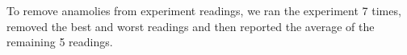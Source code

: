 To remove anamolies from experiment readings, we ran the experiment 7
times, removed the best and worst readings and then reported the
average of the remaining 5 readings.



%
%
